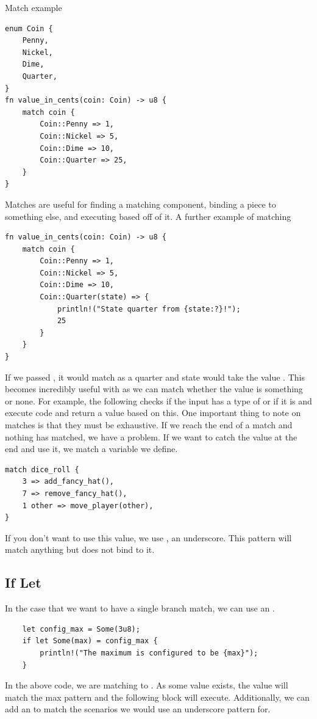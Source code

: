 \documentclass[]{article}
\begin{document}
Match example
\begin{verbatim}
enum Coin {
	Penny,
	Nickel,
	Dime,
	Quarter,
}
fn value_in_cents(coin: Coin) -> u8 {
	match coin {
		Coin::Penny => 1,
		Coin::Nickel => 5,
		Coin::Dime => 10,
		Coin::Quarter => 25,
	}
}
\end{verbatim}
Matches are useful for finding a matching component, binding a piece to something else, and executing based off of it.
A further example of matching
\begin{verbatim}
fn value_in_cents(coin: Coin) -> u8 {
	match coin {
		Coin::Penny => 1,
		Coin::Nickel => 5,
		Coin::Dime => 10,
		Coin::Quarter(state) => {
			println!("State quarter from {state:?}!");
			25
		}
	}
}
\end{verbatim}
If we passed , it would match as a quarter and state would take the value .
This becomes incredibly useful with  as we can match whether the value is something or none.
For example, the following checks if the input has a type of  or if it is  and execute code and return a value based on this.
One important thing to note on matches is that they must be exhaustive.
If we reach the end of a match and nothing has matched, we have a problem.
If we want to catch the value at the end and use it, we match a variable we define.
\begin{verbatim}
match dice_roll {
	3 => add_fancy_hat(),
	7 => remove_fancy_hat(),
	1 other => move_player(other),
}
\end{verbatim}
If you don't want to use this value, we use \code{\_}, an underscore.
This pattern will match anything but does not bind to it.
\subsection{If Let}

In the case that we want to have a single branch match, we can use an .
\begin{verbatim}
	let config_max = Some(3u8);
	if let Some(max) = config_max {
		println!("The maximum is configured to be {max}");
	}
\end{verbatim}
In the above code, we are matching  to .
As some value exists, the value will match the max pattern and the following block will execute.
Additionally, we can add an  to match the scenarios we would use an underscore pattern for.
\end{document}
